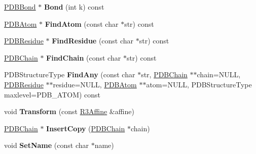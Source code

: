 \begin{DoxyCompactItemize}
\item 
\hyperlink{class_p_d_b_bond}{P\+D\+B\+Bond} $\ast$ {\bfseries Bond} (int k) const \hypertarget{class_p_d_b_model_a341e629598f9db35741233e132b8f37b}{}\label{class_p_d_b_model_a341e629598f9db35741233e132b8f37b}

\item 
\hyperlink{class_p_d_b_atom}{P\+D\+B\+Atom} $\ast$ {\bfseries Find\+Atom} (const char $\ast$str) const \hypertarget{class_p_d_b_model_ae64b3c6bc9b0cd7950ee63d84d540675}{}\label{class_p_d_b_model_ae64b3c6bc9b0cd7950ee63d84d540675}

\item 
\hyperlink{class_p_d_b_residue}{P\+D\+B\+Residue} $\ast$ {\bfseries Find\+Residue} (const char $\ast$str) const \hypertarget{class_p_d_b_model_a443830ebf1aedb6cf0c222ae5b0abdb2}{}\label{class_p_d_b_model_a443830ebf1aedb6cf0c222ae5b0abdb2}

\item 
\hyperlink{class_p_d_b_chain}{P\+D\+B\+Chain} $\ast$ {\bfseries Find\+Chain} (const char $\ast$str) const \hypertarget{class_p_d_b_model_a7e2c080a85bd0980292404a05cd2923c}{}\label{class_p_d_b_model_a7e2c080a85bd0980292404a05cd2923c}

\item 
P\+D\+B\+Structure\+Type {\bfseries Find\+Any} (const char $\ast$str, \hyperlink{class_p_d_b_chain}{P\+D\+B\+Chain} $\ast$$\ast$chain=N\+U\+LL, \hyperlink{class_p_d_b_residue}{P\+D\+B\+Residue} $\ast$$\ast$residue=N\+U\+LL, \hyperlink{class_p_d_b_atom}{P\+D\+B\+Atom} $\ast$$\ast$atom=N\+U\+LL, P\+D\+B\+Structure\+Type maxlevel=P\+D\+B\+\_\+\+A\+T\+OM) const \hypertarget{class_p_d_b_model_a6b5068739c9a0785c0e31e83c95283f7}{}\label{class_p_d_b_model_a6b5068739c9a0785c0e31e83c95283f7}

\item 
void {\bfseries Transform} (const \hyperlink{class_r3_affine}{R3\+Affine} \&affine)\hypertarget{class_p_d_b_model_a156cdc43e8af4eb2f3520300802faa72}{}\label{class_p_d_b_model_a156cdc43e8af4eb2f3520300802faa72}

\item 
\hyperlink{class_p_d_b_chain}{P\+D\+B\+Chain} $\ast$ {\bfseries Insert\+Copy} (\hyperlink{class_p_d_b_chain}{P\+D\+B\+Chain} $\ast$chain)\hypertarget{class_p_d_b_model_a3dfbaf5650373be4a162ff8099a05639}{}\label{class_p_d_b_model_a3dfbaf5650373be4a162ff8099a05639}

\item 
void {\bfseries Set\+Name} (const char $\ast$name)\hypertarget{class_p_d_b_model_a227909c5927e8fc63b944bbedf32214b}{}\label{class_p_d_b_model_a227909c5927e8fc63b944bbedf32214b}


\end{DoxyCompactItemize}

